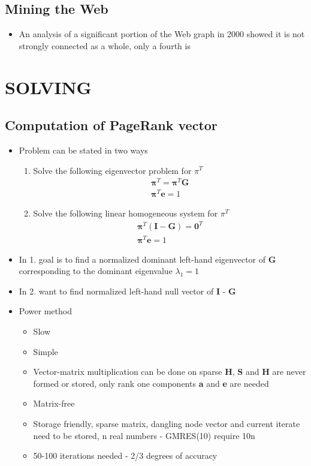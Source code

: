 \documentclass[11pt]{report}
\begin{document}
\section{Mining the Web}
\begin{itemize}
\item An analysis of a significant portion of the Web graph in 2000 showed it is not strongly connected as a whole, only a fourth is
\end{itemize}
\chapter{SOLVING}
\section{Computation of PageRank vector}
\begin{itemize}
\item Problem can be stated in two ways
\begin{enumerate}
\item Solve the following eigenvector problem for $\pi^T$ \begin{eqnarray}
\boldsymbol{\pi}^T = \boldsymbol{\pi}^T\textbf{G}\\
\boldsymbol{\pi}^T\textbf{e}=1
\end{eqnarray}
\item Solve the following linear homogeneous system for $\pi^T$
\begin{eqnarray}
\boldsymbol{\pi}^T(\textbf{I}-\textbf{G})=\textbf{0}^T\\
\boldsymbol{\pi}^T\textbf{e}=1
\end{eqnarray}
\end{enumerate}
\item In 1. goal is to find a normalized dominant left-hand eigenvector of \textbf{G} corresponding to the dominant eigenvalue $\lambda_1 = 1$
\item In 2. want to find normalized left-hand null vector of \textbf{I} - \textbf{G}
\item Power method
\begin{itemize}
\item Slow
\item Simple
\item Vector-matrix multiplication can be done on sparse \textbf{H}, \textbf{S} and \textbf{H} are never formed or stored, only rank one components \textbf{a} and \textbf{e} are needed
\item Matrix-free
\item Storage friendly, sparse matrix, dangling node vector and current iterate need to be stored, n real numbers - GMRES(10) require 10n
\item 50-100 iterations needed - 2/3 degrees of accuracy
\end{itemize}
\end{itemize}
\end{document}
